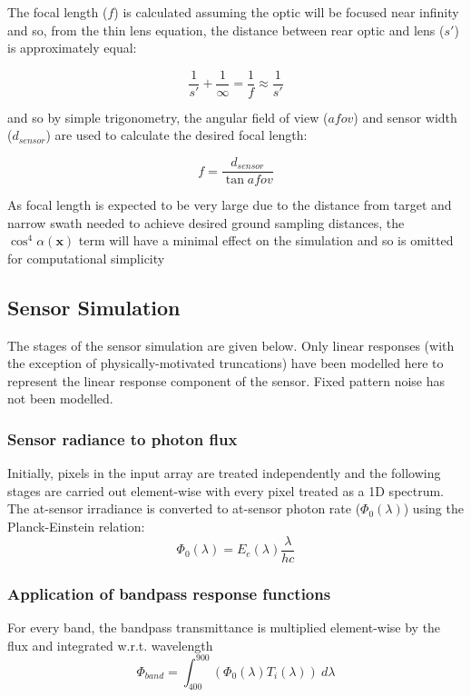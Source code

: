 \documentclass[10pt,a4paper,final,twocolumn]{article}
\begin{document}
The focal length ($f$) is calculated assuming the optic will be focused near infinity and so, from the thin lens equation, the distance between rear optic and lens ($s\prime$) is approximately equal:

\begin{equation}
\frac{1}{s\prime} + \frac{1}{\infty} = \frac{1}{f} \approx \frac{1}{s\prime}
\end{equation}

and so by simple trigonometry, the angular field of view ($afov$) and sensor width ($d_{sensor}$) are used to calculate the desired focal length:

\begin{equation}
f= \frac{d_{sensor}}{\tan afov}
\end{equation}

As focal length is expected to be very large due to the distance from target and narrow swath needed to achieve desired ground sampling distances, the $\cos^4\alpha(\textbf{x})$ term will have a minimal effect on the simulation and so is omitted for computational simplicity

\subsection{Sensor Simulation}
The stages of the sensor simulation are given below. Only linear responses (with the exception of physically-motivated truncations) have been modelled here to represent the linear response component of the sensor. Fixed pattern noise has not been modelled.

\subsubsection{Sensor radiance to photon flux}
Initially, pixels in the input array are treated independently and the following stages are carried out element-wise with every pixel treated as a 1D spectrum. The at-sensor irradiance is converted to at-sensor photon rate ($\Phi_{0}(\lambda) $) using the Planck-Einstein relation:
\begin{equation}
\Phi_{0}(\lambda) = E_e(\lambda)\frac{\lambda}{hc}
\end{equation}


\subsubsection{Application of bandpass response functions}
For every band, the bandpass transmittance is multiplied element-wise by the flux and integrated w.r.t. wavelength
\begin{equation}
\Phi_{band}= \int_{400}^{900}(\Phi_0(\lambda)T_i(\lambda))~d\lambda
\end{equation}
\end{document}
